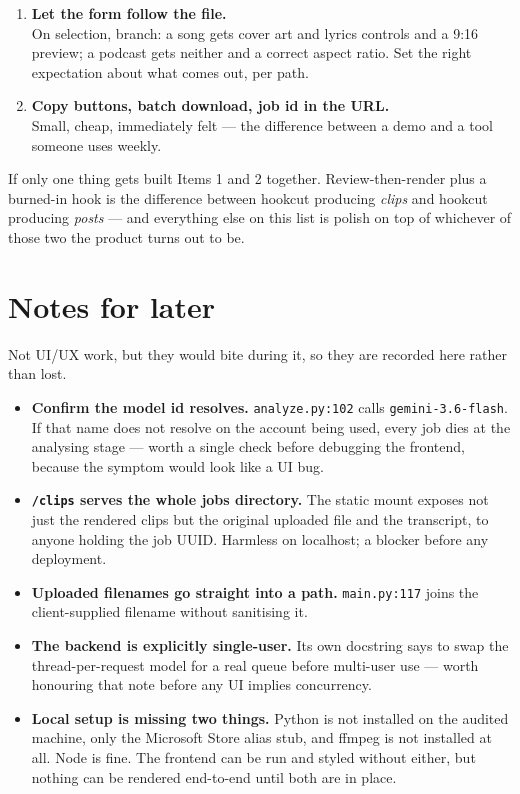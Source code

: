\documentclass[11pt,a4paper]{article}
\newcommand{\code}[1]{\texttt{\small #1}}
\begin{document}
\begin{enumerate}
\item \textbf{Let the form follow the file.}\\
      \small\color{ink2}
      On selection, branch: a song gets cover art and lyrics controls and a 9:16
      preview; a podcast gets neither and a correct aspect ratio. Set the right
      expectation about what comes out, per path.

\item \textbf{Copy buttons, batch download, job id in the URL.}\\
      \small\color{ink2}
      Small, cheap, immediately felt --- the difference between a demo and a
      tool someone uses weekly.
\end{enumerate}

\begin{callout}{If only one thing gets built}
Items 1 and 2 together. Review-then-render plus a burned-in hook is the
difference between hookcut producing \emph{clips} and hookcut producing
\emph{posts} --- and everything else on this list is polish on top of whichever
of those two the product turns out to be.
\end{callout}

\section{Notes for later}

Not UI/UX work, but they would bite during it, so they are recorded here rather
than lost.

\begin{itemize}
\item \textbf{Confirm the model id resolves.} \code{analyze.py:102} calls
      \code{gemini-3.6-flash}. If that name does not resolve on the account
      being used, every job dies at the analysing stage --- worth a single check
      before debugging the frontend, because the symptom would look like a UI
      bug.
\item \textbf{\code{/clips} serves the whole jobs directory.} The static mount
      exposes not just the rendered clips but the original uploaded file and the
      transcript, to anyone holding the job UUID. Harmless on localhost; a
      blocker before any deployment.
\item \textbf{Uploaded filenames go straight into a path.} \code{main.py:117}
      joins the client-supplied filename without sanitising it.
\item \textbf{The backend is explicitly single-user.} Its own docstring says to
      swap the thread-per-request model for a real queue before multi-user use
      --- worth honouring that note before any UI implies concurrency.
\item \textbf{Local setup is missing two things.} Python is not installed on the
      audited machine, only the Microsoft Store alias stub, and ffmpeg is not
      installed at all. Node is fine. The frontend can be run and styled without
      either, but nothing can be rendered end-to-end until both are in place.
\end{itemize}
\end{document}
